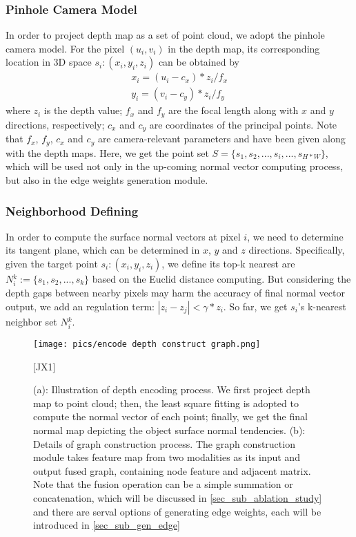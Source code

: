 ﻿\documentclass[journal]{IEEEtran}
\begin{document}
    \subsubsection{Pinhole Camera Model}  In order to project depth map as a set of point cloud, we adopt the pinhole camera model. For the pixel $(u_{i},v_{i})$ in the depth map, its corresponding location in 3D space $\mathit{s_{i}}:(x_{i},y_{i},z_{i})$ can be obtained by
    \begin{equation}
        \begin{split}
        x_{i} = (u_{i} - c_{x})*z_{i}/f_{x}\\
        y_{i} = (v_{i} - c_{y})*z_{i}/f_{y}
        \end{split}
    \end{equation}
    where $z_{i}$ is the depth value; $f_{x}$ and $f_{y}$ are the focal length along with $x$ and $y$ directions, respectively; $c_{x}$ and $c_{y}$ are coordinates of the principal points. Note that $f_{x}$, $f_{y}$, $c_{x}$ and $c_{y}$ are camera-relevant parameters and have been given along with the depth maps. Here, we get the point set ${S}=\{ {s_{1}}, {s_{2}}, ..., {s_{i}} , ...  , {s_{H*W}} \}$, which will be used not only in the up-coming normal vector computing process, but also in the edge weights generation module. 
    
 
    \subsubsection{Neighborhood Defining}  In order to compute the surface normal vectors at pixel $i$, we need to determine its tangent plane, which can be determined in $x$, $y$ and $z$ directions. Specifically, given the target point ${s_{i}}:(x_{i},y_{i},z_{i})$, we define its top-k nearest are $N{_i^k}:=  \{ s_{1}, s_{2}, ..., s_k\}$ based on the Euclid distance computing. But considering the depth gaps between nearby pixels may harm the accuracy of final normal vector output, we add an regulation term: $ |z_{i} - z_{j} | < \gamma *z_{i} $. So far, we get ${s_{i}}$'s k-nearest neighbor set $N{_i^k}$. 
    
    \begin{figure*}
        \centering
        \texttt{[image: pics/encode depth construct graph.png]}
        \caption{(a): Illustration of depth encoding process. We first project depth map to point cloud; then, the least square fitting is adopted to compute the normal vector of each point; finally, we get the final normal map depicting the object surface normal tendencies. (b): Details of graph construction process. The graph construction module takes feature map from two modalities as its input and output fused graph, containing node feature and adjacent matrix. Note that the fusion operation can be a simple summation or concatenation, which will be discussed in \ref{sec_sub_ablation_study} and there are serval options of generating edge weights, each will be introduced in \ref{sec_sub_gen_edge} }[JX1]
        \label{fig_depth_encoding_and_graph_construction}
    \end{figure*}
 
\end{document}
